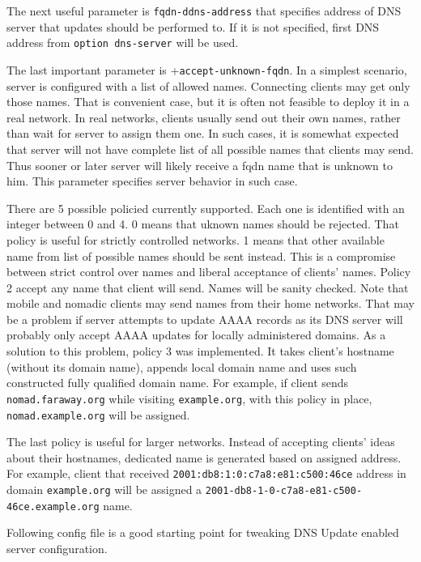 The next useful parameter is \verb+fqdn-ddns-address+ that specifies
address of DNS server that updates should be performed to. If it is
not specified, first DNS address from \verb+option dns-server+ will be
used.

The last important parameter is +\verb+accept-unknown-fqdn+. In a
simplest scenario, server is configured with a list of allowed
names. Connecting clients may get only those names. That is convenient
case, but it is often not feasible to deploy it in a real network.  In
real networks, clients usually send out their own names, rather than
wait for server to assign them one. In such cases, it is somewhat
expected that server will not have complete list of all possible names
that clients may send. Thus sooner or later server will likely receive
a fqdn name that is unknown to him. This parameter specifies server
behavior in such case.

There are 5 possible policied currently supported. Each one is
identified with an integer between 0 and 4. 0 means that uknown names
should be rejected. That policy is useful for strictly controlled
networks. 1 means that other available name from list of possible
names should be sent instead. This is a compromise between strict
control over names and liberal acceptance of clients' names. Policy 2
accept any name that client will send. Names will be sanity
checked. Note that mobile and nomadic clients may send names from
their home networks. That may be a problem if server attempts to
update AAAA records as its DNS server will probably only accept AAAA
updates for locally administered domains. As a solution to this
problem, policy 3 was implemented. It takes client's hostname (without
its domain name), appends local domain name and uses such constructed
fully qualified domain name. For example, if client
sends \verb+nomad.faraway.org+ while visiting \verb+example.org+, with
this policy in place, \verb+nomad.example.org+ will be assigned.

The last policy is useful for larger networks. Instead of accepting
clients' ideas about their hostnames, dedicated name is generated
based on assigned address. For example, client that received
\verb+2001:db8:1:0:c7a8:e81:c500:46ce+ address in domain
\verb+example.org+ will be assigned
a \verb+2001-db8-1-0-c7a8-e81-c500-46ce.example.org+ name.

Following config file is a good starting point for tweaking DNS
Update enabled server configuration.

